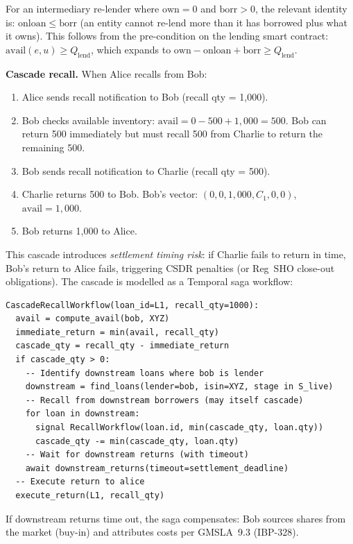 \documentclass[11pt,a4paper]{article}
\begin{document}
For an intermediary re-lender where $\mathrm{own} = 0$ and $\mathrm{borr} > 0$, the relevant identity is: $\mathrm{onloan} \leq \mathrm{borr}$ (an entity cannot re-lend more than it has borrowed plus what it owns). This follows from the pre-condition on the lending smart contract: $\mathrm{avail}(e, u) \geq Q_{\mathrm{lend}}$, which expands to $\mathrm{own} - \mathrm{onloan} + \mathrm{borr} \geq Q_{\mathrm{lend}}$.

\medskip
\noindent\textbf{Cascade recall.} When Alice recalls from Bob:

\begin{enumerate}[nosep]
\item Alice sends recall notification to Bob (recall qty = 1{,}000).
\item Bob checks available inventory: $\mathrm{avail} = 0 - 500 + 1{,}000 = 500$. Bob can return 500 immediately but must recall 500 from Charlie to return the remaining 500.
\item Bob sends recall notification to Charlie (recall qty = 500).
\item Charlie returns 500 to Bob. Bob's vector: $(0, 0, 1{,}000, C_1, 0, 0)$, $\mathrm{avail} = 1{,}000$.
\item Bob returns 1{,}000 to Alice.
\end{enumerate}

\noindent This cascade introduces \emph{settlement timing risk}: if Charlie fails to return in time, Bob's return to Alice fails, triggering CSDR penalties (or Reg~SHO close-out obligations). The cascade is modelled as a Temporal saga workflow:

\begin{lstlisting}
CascadeRecallWorkflow(loan_id=L1, recall_qty=1000):
  avail = compute_avail(bob, XYZ)
  immediate_return = min(avail, recall_qty)
  cascade_qty = recall_qty - immediate_return
  if cascade_qty > 0:
    -- Identify downstream loans where bob is lender
    downstream = find_loans(lender=bob, isin=XYZ, stage in S_live)
    -- Recall from downstream borrowers (may itself cascade)
    for loan in downstream:
      signal RecallWorkflow(loan.id, min(cascade_qty, loan.qty))
      cascade_qty -= min(cascade_qty, loan.qty)
    -- Wait for downstream returns (with timeout)
    await downstream_returns(timeout=settlement_deadline)
  -- Execute return to alice
  execute_return(L1, recall_qty)
\end{lstlisting}

\noindent If downstream returns time out, the saga compensates: Bob sources shares from the market (buy-in) and attributes costs per GMSLA~9.3 (IBP-328).
\end{document}
